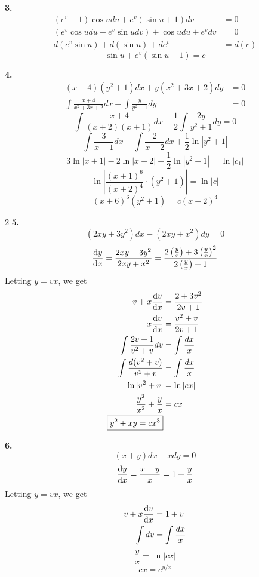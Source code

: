 {    \textbf{3.}
    \begin{align*}
        (e^v+1)\cos{u} d{u} + e^v(\sin{u}+1) d{v} &= 0 \\
        (e^v\cos{u} du + e^v\sin{u} dv) + \cos{u} du + e^v dv &= 0 \\
        d(e^v\sin u) + d(\sin u) + d{e^v} &= d(c)
    \end{align*}
    \[ \boxed{\sin u + e^v(\sin u + 1) = c} \]

    \textbf{4.}
    \begin{align*}
        (x+4)(y^2+1) d{x} + y(x^2+3x+2) d{y} &= 0 \\
        \int{\frac{x+4}{x^2+3x+2}} d{x} + \int{\frac{y}{y^2+1}} d{y} &= 0
    \end{align*}
    \[ \int{\frac{x+4}{(x+2)(x+1)}} d{x} + \frac{1}{2}\int{\frac{2y}{y^2+1}} d{y} = 0 \]
    \[ \int{\frac{3}{x+1}} d{x} - \int{\frac{2}{x+2}} d{x} + \frac{1}{2}\ln|y^2+1| \]
    \[ 3\ln|x+1| - 2\ln|x+2| + \frac{1}{2}\ln|y^2+1| = \ln|c_1| \]
    \[ \ln \left| \frac{(x+1)^6}{(x+2)^4} \cdot (y^2+1) \right| = \ln|c| \]
    \[ \boxed{(x+6)^6 (y^2+1) = c(x+2)^4} \]

    \begin{multicols}{2}
        \textbf{5.}
        \[ (2xy + 3y^2) d{x} - (2xy + x^2) d{y} = 0 \]
        \[ \dv{y}{x} = \frac{2xy + 3y^2}{2xy + x^2} = \frac{2\left(\frac{y}{x}\right) + 3\left(\frac{y}{x}\right)^2}{2\left(\frac{y}{x}\right) + 1} \]
        Letting $y = vx$, we get
        \begin{align*}
            v + x\dv{v}{x} &= \frac{2 + 3v^2}{2v + 1} \\
            x\dv{v}{x} &= \frac{v^2 + v}{2v + 1} \\
            \int{\frac{2v+1}{v^2+v}} d{v} &= \int{\frac{dx}{x}} \\
            \int{\frac{d(v^2+v)}{v^2+v}} &= \int{\frac{dx}{x}} \\
            \ln|v^2+v| &= \ln|cx| \\
            \frac{y^2}{x^2} + \frac{y}{x} &= cx \\
            \boxed{y^2 + xy = cx^3}
        \end{align*}

        \columnbreak

        \textbf{6.}
        \[ (x+y) d{x} - x d{y} = 0 \]
        \[ \dv{y}{x} = \frac{x+y}{x} = 1+\frac{y}{x} \]
        Letting $y = vx$, we get
        \begin{align*}
            v + x\dv{v}{x} &= 1 + v \\
            \int{dv} &= \int{\frac{dx}{x}}
        \end{align*}
        \[ \frac{y}{x} = \ln|cx| \]
        \[ \boxed{cx = e^{y/x}} \]
    \end{multicols}

}
